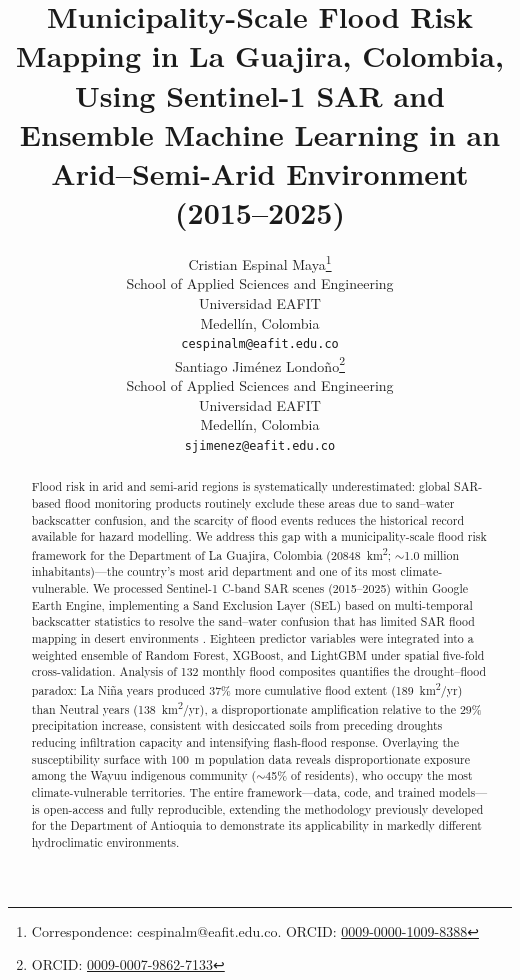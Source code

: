 \documentclass{article}
\title{Municipality-Scale Flood Risk Mapping in La Guajira, Colombia, Using Sentinel-1 SAR and Ensemble Machine Learning in an Arid--Semi-Arid Environment (2015--2025)}
\author{
  Cristian Espinal Maya\thanks{Correspondence: cespinalm@eafit.edu.co. ORCID: \href{https://orcid.org/0009-0000-1009-8388}{0009-0000-1009-8388}} \\
  School of Applied Sciences and Engineering\\
  Universidad EAFIT\\
  Medell\'in, Colombia \\
  \texttt{cespinalm@eafit.edu.co} \\
  \And
  Santiago Jim\'enez Londo\~no\thanks{ORCID: \href{https://orcid.org/0009-0007-9862-7133}{0009-0007-9862-7133}} \\
  School of Applied Sciences and Engineering\\
  Universidad EAFIT\\
  Medell\'in, Colombia \\
  \texttt{sjimenez@eafit.edu.co} \\
}
\begin{document}
\maketitle

\begin{abstract}
Flood risk in arid and semi-arid regions is systematically underestimated: global SAR-based flood monitoring products routinely exclude these areas due to sand--water backscatter confusion, and the scarcity of flood events reduces the historical record available for hazard modelling. We address this gap with a municipality-scale flood risk framework for the Department of La Guajira, Colombia (\SI{20848}{\kilo\metre\squared}; $\sim$1.0 million inhabitants)---the country's most arid department and one of its most climate-vulnerable. We processed Sentinel-1 C-band SAR scenes (2015--2025) within Google Earth Engine, implementing a Sand Exclusion Layer (SEL) based on multi-temporal backscatter statistics to resolve the sand--water confusion that has limited SAR flood mapping in desert environments \citep{Martinis2018, Garg2024}. Eighteen predictor variables were integrated into a weighted ensemble of Random Forest, XGBoost, and LightGBM under spatial five-fold cross-validation. Analysis of 132 monthly flood composites quantifies the drought--flood paradox: La Ni\~na years produced 37\% more cumulative flood extent (\SI{189}{\kilo\metre\squared/yr}) than Neutral years (\SI{138}{\kilo\metre\squared/yr}), a disproportionate amplification relative to the 29\% precipitation increase, consistent with desiccated soils from preceding droughts reducing infiltration capacity and intensifying flash-flood response. Overlaying the susceptibility surface with \SI{100}{\metre} population data reveals disproportionate exposure among the Wayuu indigenous community ($\sim$45\% of residents), who occupy the most climate-vulnerable territories. The entire framework---data, code, and trained models---is open-access and fully reproducible, extending the methodology previously developed for the Department of Antioquia \citep{EspinalMaya2026} to demonstrate its applicability in markedly different hydroclimatic environments.
\end{abstract}


\end{document}
